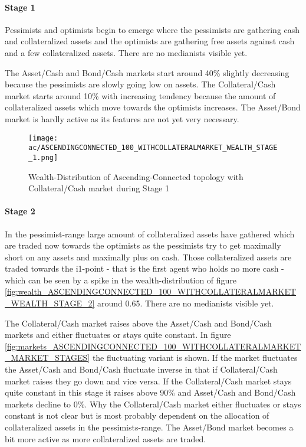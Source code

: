 \documentclass[Bachelorarbeit.tex]{subfiles}
\begin{document}
\paragraph{Stage 1}
Pessimists and optimists begin to emerge where the pessimists are gathering cash and collateralized assets and the optimists are gathering free assets against cash and a few collateralized assets. There are no medianists visible yet.

\medskip

The Asset/Cash and Bond/Cash markets start around 40\% slightly decreasing because the pessimists are slowly going low on assets. The Collateral/Cash market starts around 10\% with increasing tendency because the amount of collateralized assets which move towards the optimists increases. The Asset/Bond market is hardly active as its features are not yet very necessary.
		
\begin{figure}[H]
	\centering
  \texttt{[image: ac/ASCENDINGCONNECTED\_100\_WITHCOLLATERALMARKET\_WEALTH\_STAGE\_1.png]}
  	\caption{Wealth-Distribution of Ascending-Connected topology with Collateral/Cash market during Stage 1}
	\label{fig:wealth_ASCENDINGCONNECTED_100_WITHCOLLATERALMARKET_WEALTH_STAGE_1}
\end{figure}

\paragraph{Stage 2}
In the pessimist-range large amount of collateralized assets have gathered which are traded now towards the optimists as the pessimists try to get maximally short on any assets and maximally plus on cash. Those collateralized assets are traded towards the i1-point - that is the first agent who holds no more cash - which can be seen by a spike in the wealth-distribution of figure \ref{fig:wealth_ASCENDINGCONNECTED_100_WITHCOLLATERALMARKET_WEALTH_STAGE_2} around 0.65.
There are no medianists visible yet.

\medskip

The Collateral/Cash market raises above the Asset/Cash and Bond/Cash markets and either fluctuates or stays quite constant. In figure \ref{fig:markets_ASCENDINGCONNECTED_100_WITHCOLLATERALMARKET_MARKET_STAGES} the fluctuating variant is shown. If the market fluctuates the Asset/Cash and Bond/Cash fluctuate inverse in that if Collateral/Cash market raises they go down and vice versa. If the Collateral/Cash market stays quite constant in this stage it raises above 90\% and Asset/Cash and Bond/Cash markets decline to 0\%. Why the Collateral/Cash market either fluctuates or stays constant is not clear but is most probably dependent on the allocation of collateralized assets in the pessimists-range. The Asset/Bond market becomes a bit more active as more collateralized assets are traded.
\end{document}
